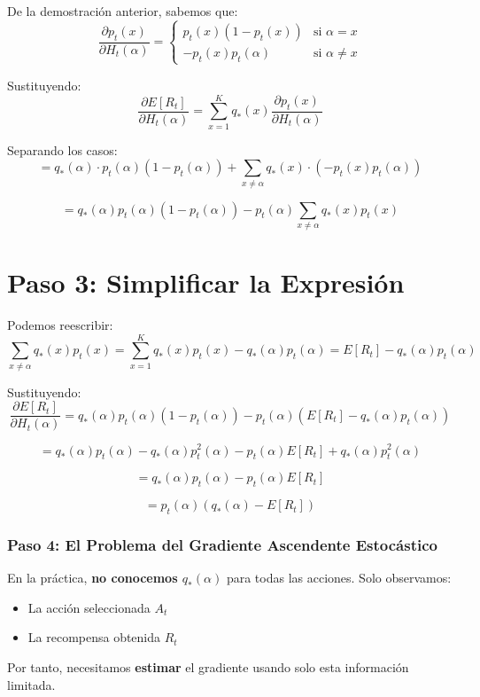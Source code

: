 \documentclass[12pt,a4paper]{article}
\begin{document}
De la demostración anterior, sabemos que:
$$\frac{\partial p_t(x)}{\partial H_t(\alpha)} = \begin{cases}
p_t(x)(1 - p_t(x)) & \text{si } \alpha = x \\
-p_t(x)p_t(\alpha) & \text{si } \alpha \neq x
\end{cases}$$

Sustituyendo:
$$\frac{\partial E[R_t]}{\partial H_t(\alpha)} = \sum_{x=1}^{K} q_*(x) \frac{\partial p_t(x)}{\partial H_t(\alpha)}$$

Separando los casos:
$$= q_*(\alpha) \cdot p_t(\alpha)(1 - p_t(\alpha)) + \sum_{x \neq \alpha} q_*(x) \cdot (-p_t(x)p_t(\alpha))$$

$$= q_*(\alpha)p_t(\alpha)(1 - p_t(\alpha)) - p_t(\alpha)\sum_{x \neq \alpha} q_*(x)p_t(x)$$

\section{Paso 3: Simplificar la Expresión}

Podemos reescribir:
$$\sum_{x \neq \alpha} q_*(x)p_t(x) = \sum_{x=1}^{K} q_*(x)p_t(x) - q_*(\alpha)p_t(\alpha) = E[R_t] - q_*(\alpha)p_t(\alpha)$$

Sustituyendo:
$$\frac{\partial E[R_t]}{\partial H_t(\alpha)} = q_*(\alpha)p_t(\alpha)(1 - p_t(\alpha)) - p_t(\alpha)(E[R_t] - q_*(\alpha)p_t(\alpha))$$

$$= q_*(\alpha)p_t(\alpha) - q_*(\alpha)p_t^2(\alpha) - p_t(\alpha)E[R_t] + q_*(\alpha)p_t^2(\alpha)$$

$$= q_*(\alpha)p_t(\alpha) - p_t(\alpha)E[R_t]$$

$$= p_t(\alpha)(q_*(\alpha) - E[R_t])$$

\subsubsection{Paso 4: El Problema del Gradiente Ascendente Estocástico}

En la práctica, \textbf{no conocemos $q_*(\alpha)$} para todas las acciones. Solo observamos:
\begin{itemize}
    \item La acción seleccionada $A_t$
    \item La recompensa obtenida $R_t$
\end{itemize}

Por tanto, necesitamos \textbf{estimar} el gradiente usando solo esta información limitada.
\end{document}
